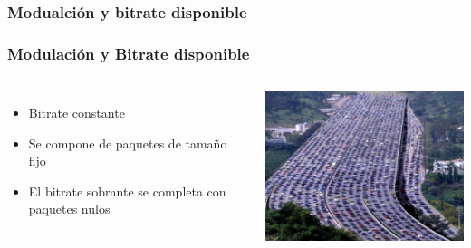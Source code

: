 \documentclass[a4paper,11pt]{beamer}
\begin{document}

		\subsubsection{Modualción y bitrate disponible}
		\begin{frame}
			\frametitle{Modulación y Bitrate disponible}
				\begin{columns}[c] %
					\begin{itemize}
						\item Bitrate constante
						\item Se compone de paquetes de tamaño fijo
						\item El bitrate sobrante se completa con paquetes nulos
					\end{itemize}
					\begin{center}
						\includegraphics[width=7.5cm]{autopista.png}
					\end{center}	
				\end{columns}		
		\end{frame}
\end{document}
